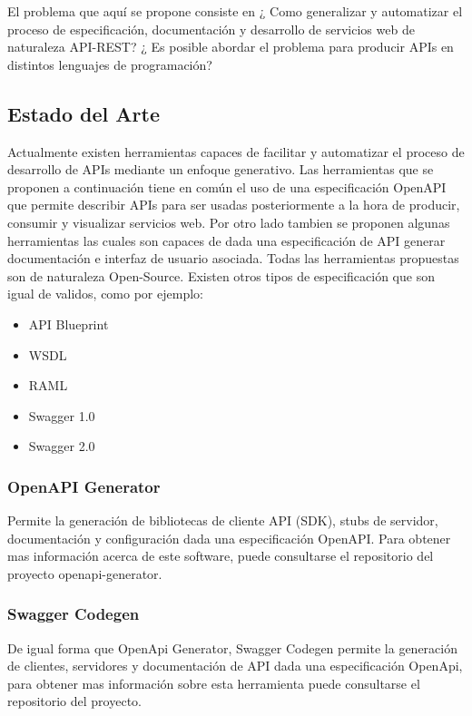 \documentclass{svproc}
\begin{document}
El problema que aquí se propone consiste en ¿ Como generalizar y automatizar el proceso de especificación, documentación y desarrollo de servicios web de naturaleza API-REST?
¿ Es posible abordar el problema para producir APIs en distintos lenguajes de programación? 

\subsection{Estado del Arte}
Actualmente existen herramientas capaces de facilitar y automatizar el proceso de desarrollo de APIs mediante un enfoque generativo. Las  herramientas que se proponen a continuación tiene en común el uso de  una especificación OpenAPI\cite{spec} que permite describir APIs para ser usadas posteriormente a la hora de producir, consumir y visualizar servicios web. Por otro lado tambien se proponen algunas herramientas las cuales son capaces de dada una especificación de API generar documentación e interfaz de usuario asociada. Todas las herramientas propuestas son de naturaleza Open-Source. Existen otros tipos de especificación que son igual de validos, como por ejemplo:


\begin{itemize}
\item API Blueprint
\item WSDL
\item RAML
\item Swagger 1.0
\item Swagger 2.0
\end{itemize}

\subsubsection{OpenAPI Generator}

Permite la generación de bibliotecas de cliente API (SDK), stubs de servidor, documentación y configuración dada una especificación OpenAPI. Para obtener mas información acerca de este software, puede consultarse el repositorio del proyecto openapi-generator.\cite{openapi}

\subsubsection{Swagger Codegen}

De igual forma que OpenApi Generator, Swagger Codegen permite la generación de clientes, servidores y documentación de API dada una especificación OpenApi, para obtener mas información sobre esta herramienta puede consultarse el repositorio del proyecto.\cite{swagger}
\end{document}
